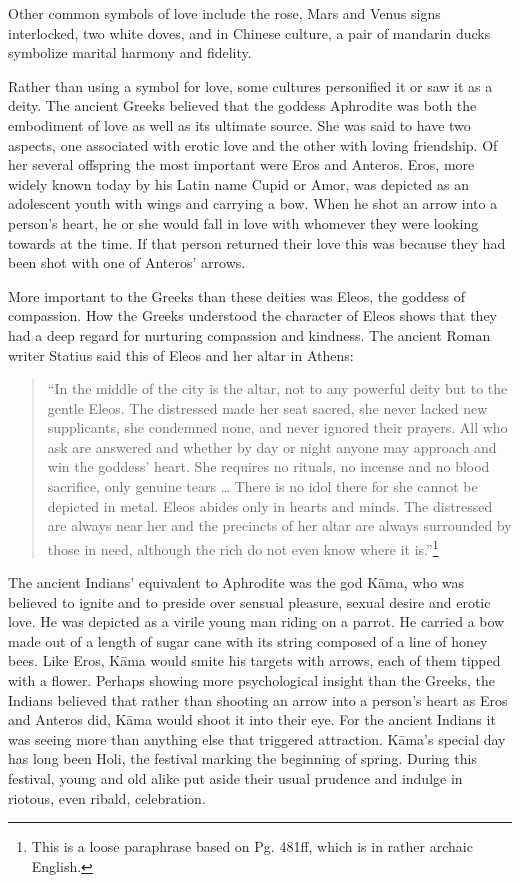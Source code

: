 \documentclass[10pt, openright]{book}
\begin{document}
Other common symbols of love include the rose, Mars and Venus signs interlocked, two white doves, and in Chinese culture, a pair of mandarin ducks symbolize marital harmony and fidelity.


Rather than using a symbol for love, some cultures personified it or saw it as a deity. The ancient Greeks believed that the goddess Aphrodite was both the embodiment of love as well as its ultimate source. She was said to have two aspects, one associated with erotic love and the other with loving friendship. Of her several offspring the most important were Eros and Anteros. Eros, more widely known today by his Latin name Cupid or Amor, was depicted as an adolescent youth with wings and carrying a bow. When he shot an arrow into a person’s heart, he or she would fall in love with whomever they were looking towards at the time. If that person returned their love this was because they had been shot with one of Anteros’ arrows.


More important to the Greeks than these deities was Eleos, the goddess of compassion. How the Greeks understood the character of Eleos shows that they had a deep regard for nurturing compassion and kindness. The ancient Roman writer Statius said this of Eleos and her altar in Athens:


\begin{quote}


“In the middle of the city is the altar, not to any powerful deity but to the gentle Eleos. The distressed made her seat sacred, she never lacked new supplicants, she condemned none, and never ignored their prayers. All who ask are answered and whether by day or night anyone may approach and win the goddess’ heart. She requires no rituals, no incense and no blood sacrifice, only genuine tears … There is no idol there for she cannot be depicted in metal. Eleos abides only in hearts and minds. The distressed are always near her and the precincts of her altar are always surrounded by those in need, although the rich do not even know where it is.”\footnote {This is a loose paraphrase based on \cite{Mozley 1928} Pg. 481ff, which is in rather archaic English.}




\end{quote}
The ancient Indians’ equivalent to Aphrodite was the god Kāma, who was believed to ignite and to preside over sensual pleasure, sexual desire and erotic love. He was depicted as a virile young man riding on a parrot. He carried a bow made out of a length of sugar cane with its string composed of a line of honey bees. Like Eros, Kāma would smite his targets with arrows, each of them tipped with a flower. Perhaps showing more psychological insight than the Greeks, the Indians believed that rather than shooting an arrow into a person’s heart as Eros and Anteros did, Kāma would shoot it into their eye. For the ancient Indians it was seeing more than anything else that triggered attraction. Kāma’s special day has long been Holi, the festival marking the beginning of spring. During this festival, young and old alike put aside their usual prudence and indulge in riotous, even ribald, celebration.
\end{document}
